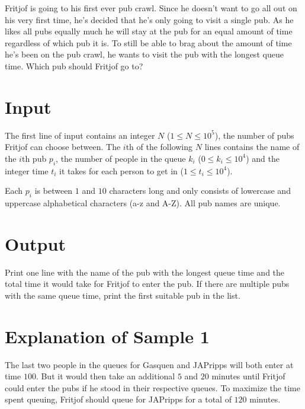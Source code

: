 
Fritjof is going to his first ever pub crawl. Since he doesn't want to go all out on his very first
time, he's decided that he's only going to visit a single pub. As he likes all pubs equally much he
will stay at the pub for an equal amount of time regardless of which pub it is. To still be able to
brag about the amount of time he's been on the pub crawl, he wants to visit the pub with the longest
queue time. Which pub should Fritjof go to?

\section*{Input}

The first line of input contains an integer $N$ ($1 \leq N \leq 10^5$), the number of pubs Fritjof
can choose between. The $i$th of the following $N$ lines contains the name of the $i$th pub $p_i$, the number of
people in the queue $k_i$ ($0 \leq k_i \leq 10^4$) and the integer time $t_i$ it takes for each person to get in
($1 \leq t_i \leq 10^4$).

Each $p_i$ is between $1$ and $10$ characters long and only consists of lowercase and uppercase
alphabetical characters (a-z and A-Z). All pub names are unique.

\section*{Output}

Print one line with the name of the pub with the longest queue time and the total
time it would take for Fritjof to enter the pub. If there are multiple pubs with the same queue time,
print the first suitable pub in the list.

\section*{Explanation of Sample 1}

The last two people in the queues for Gasquen and JAPripps will both enter at time $100$. But it would
then take an additional $5$ and $20$ minutes until Fritjof could enter the pubs if he stood in their
respective queues. To maximize the time spent queuing, Fritjof should queue for JAPripps for a total
of $120$ minutes.
